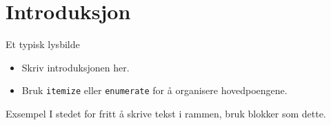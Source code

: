 \documentclass[aspectratio=169,mathserif]{beamer}
\begin{document}
	\section{Introduksjon}
	
	\begin{frame}{Et typisk lysbilde}
		
		
		\begin{itemize}
			\item Skriv introduksjonen her.
			\item Bruk \texttt{itemize} eller \texttt{enumerate} for å organisere hovedpoengene.
		\end{itemize}
		
		\vskip 1cm
		
		\begin{block}{Exsempel}
			I stedet for fritt å skrive tekst i rammen, bruk blokker som dette.
		\end{block}
		
	\end{frame}
	
	
\end{document}
